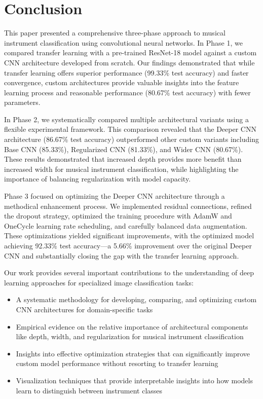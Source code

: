 \section{Conclusion}
This paper presented a comprehensive three-phase approach to musical instrument classification using convolutional neural networks. In Phase 1, we compared transfer learning with a pre-trained ResNet-18 model against a custom CNN architecture developed from scratch. Our findings demonstrated that while transfer learning offers superior performance (99.33\% test accuracy) and faster convergence, custom architectures provide valuable insights into the feature learning process and reasonable performance (80.67\% test accuracy) with fewer parameters.

In Phase 2, we systematically compared multiple architectural variants using a flexible experimental framework. This comparison revealed that the Deeper CNN architecture (86.67\% test accuracy) outperformed other custom variants including Base CNN (85.33\%), Regularized CNN (81.33\%), and Wider CNN (80.67\%). These results demonstrated that increased depth provides more benefit than increased width for musical instrument classification, while highlighting the importance of balancing regularization with model capacity.

Phase 3 focused on optimizing the Deeper CNN architecture through a methodical enhancement process. We implemented residual connections, refined the dropout strategy, optimized the training procedure with AdamW and OneCycle learning rate scheduling, and carefully balanced data augmentation. These optimizations yielded significant improvements, with the optimized model achieving 92.33\% test accuracy—a 5.66\% improvement over the original Deeper CNN and substantially closing the gap with the transfer learning approach.

Our work provides several important contributions to the understanding of deep learning approaches for specialized image classification tasks:

\begin{itemize}
    \item A systematic methodology for developing, comparing, and optimizing custom CNN architectures for domain-specific tasks
    
    \item Empirical evidence on the relative importance of architectural components like depth, width, and regularization for musical instrument classification
    
    \item Insights into effective optimization strategies that can significantly improve custom model performance without resorting to transfer learning
    
    \item Visualization techniques that provide interpretable insights into how models learn to distinguish between instrument classes
\end{itemize}

